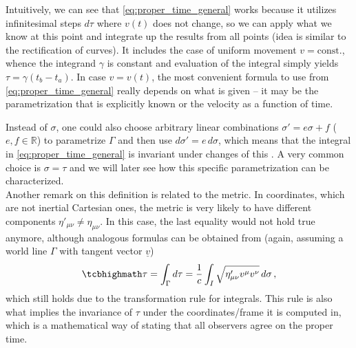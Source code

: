 Intuitively, we can see that \eqref{eq:proper_time_general} works because it utilizes infinitesimal steps $d\tau$ where $v(t)$ does not change, so we can apply what we know at this point and integrate up the results from all points (idea is similar to the rectification of curves). It includes the case of uniform movement $v = \text{const.}$, whence the integrand $\gamma$ is constant and evaluation of the integral simply yields $\tau = \gamma (t_b - t_a)$. In case $v = v(t)$, the most convenient formula to use from \eqref{eq:proper_time_general} really depends on what is given -- it may be the parametrization that is explicitly known or the velocity as a function of time.

Instead of $\sigma$, one could also choose arbitrary linear combinations $\sigma' = e \sigma + f$ ($e, f \in \mathbb{R}$) to parametrize $\Gamma$ and then use $d\sigma' = e \, d\sigma$, which means that the integral in \eqref{eq:proper_time_general} is invariant under changes of this . A very common choice is $\sigma = \tau$ and we will later see how this specific parametrization can be characterized.\\


Another remark on this definition is related to the metric. In coordinates, which are not inertial Cartesian ones, the metric is very likely to have different components $\eta'_{\mu \nu} \neq \eta_{\mu \nu}$. In this case, the last equality would not hold true anymore, although analogous formulas can be obtained from (again, assuming a world line $\Gamma$ with tangent vector $\underline{v}$)
\begin{equation}\label{eq:proper_time_non_cartesian}
	\eqbox{
	\tau = \int_\Gamma d\tau = \frac{1}{c} \int_I \sqrt{\eta'_{\mu \nu} v^\mu v^\nu} \, d\sigma
	} \, ,
\end{equation}
which still holds due to the transformation rule for integrals. This rule is also what implies the invariance of $\tau$ under the coordinates/frame it is computed in, which is a mathematical way of stating that all observers agree on the proper time.



